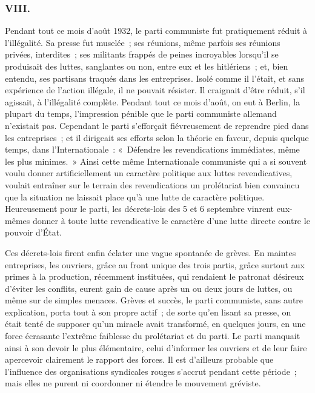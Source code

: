 \documentclass[french,twoside]{book} %
\begin{document}
\subsubsection[{VIII.}]{VIII.}
\noindent Pendant tout ce mois d'août 1932, le parti communiste fut pratiquement réduit à l'illégalité. Sa presse fut muselée ; ses réunions, même parfois ses réunions privées, interdites ; ses militants frappés de peines incroyables lorsqu'il se produisait des luttes, sanglantes ou non, entre eux et les hitlériens ; et, bien entendu, ses partisans traqués dans les entreprises. Isolé comme il l'était, et sans expérience de l'action illégale, il ne pouvait résister. Il craignait d'être réduit, s'il agissait, à l'illégalité complète. Pendant tout ce mois d'août, on eut à Berlin, la plupart du temps, l'impression pénible que le parti commu­niste allemand n'existait pas. Cependant le parti s'efforçait fiévreusement de reprendre pied dans les entreprises ; et il dirigeait ses efforts selon la théorie en faveur, depuis quelque temps, dans l'Internationale : « Défendre les revendications immédiates, même les plus minimes. » Ainsi cette même Internationale communiste qui a si souvent voulu donner artificiellement un caractère politique aux luttes revendicatives, voulait entraîner sur le terrain des revendications un prolétariat bien convaincu que la situation ne laissait place qu'à une lutte de caractère politique. Heureusement pour le parti, les décrets-lois des 5 et 6 septembre vinrent eux-mêmes donner à toute lutte revendicative le caractère d'une lutte directe contre le pouvoir d'État.\par
Ces décrets-lois firent enfin éclater une vague spontanée de grèves. En maintes entreprises, les ouvriers, grâce au front unique des trois partis, grâce surtout aux primes à la production, récemment instituées, qui rendaient le patronat désireux d'éviter les conflits, eurent gain de cause après un ou deux jours de luttes, ou même sur de simples menaces. Grèves et succès, le parti communiste, sans autre explication, porta tout à son propre actif ; de sorte qu'en lisant sa presse, on était tenté de supposer qu'un miracle avait transfor­mé, en quelques jours, en une force écrasante l'extrême faiblesse du prolétariat et du parti. Le parti manquait ainsi à son devoir le plus élémentaire, celui d'informer les ouvriers et de leur faire apercevoir clairement le rapport des forces. Il est d'ailleurs probable que l'influence des organisations syndicales rouges s'accrut pendant cette période ; mais elles ne purent ni coordonner ni étendre le mouvement gréviste.\par
\end{document}
